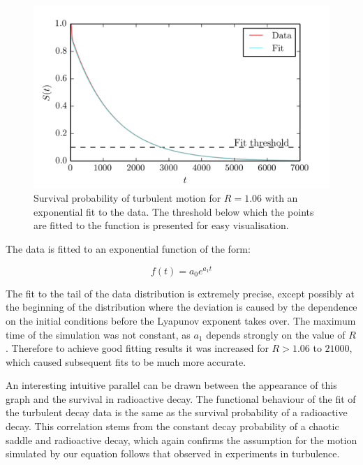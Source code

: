 \documentclass[11pt,a4paper]{article}
\begin{document}
\begin{figure}[h!]
    \centering
    \includegraphics[width=\textwidth]{surv_prob.png}
    \caption{Survival probability of turbulent motion for $R=1.06$ with an exponential fit to the data. The threshold below which the points are fitted to the function is presented for easy visualisation.}\label{img:surv_prob}
\end{figure}

The data is fitted to an exponential function of the form:

\[ f(t) = a_0 e^{a_1t}\]

The fit to the tail of the data distribution is extremely precise, except possibly at the beginning of the distribution where the deviation is caused by the dependence on the initial conditions before the Lyapunov exponent takes over.
The maximum time of the simulation was not constant, as $a_1$ depends strongly on the value of $R$.
Therefore to achieve good fitting results it was increased for $R > 1.06$ to $21000$, which caused subsequent fits to be much more accurate.

An interesting intuitive parallel can be drawn between the appearance of this graph and the survival in radioactive decay.
The functional behaviour of the fit of the turbulent decay data is the same as the survival probability of a radioactive decay.
This correlation stems from the constant decay probability of a chaotic saddle and radioactive decay, which again confirms the assumption for the motion simulated by our equation follows that observed in experiments in turbulence.
\end{document}
